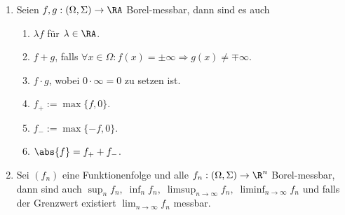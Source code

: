 \begin{prop}
\label{prop:3.24}
\begin{enumerate}[label=\arabic{*}.)]
  \item Seien $f,g: (\Omega,\Sigma)\to\RA$ Borel-messbar, dann sind es auch
  \begin{enumerate}[label=(\roman{*})]
    \item $\lambda f$ für $\lambda\in\RA$.
    \item $f+g$, falls $\forall x\in\Omega : f(x) = \pm\infty \Rightarrow g(x)\neq
  \mp\infty$.
  \item  $f\cdot g$, wobei $0\cdot\infty = 0$ zu setzen ist.
  \item $f_+ := \max\{f,0\}$.
  \item $f_- := \max\{-f,0\}$.
  \item $\abs{f} = f_+ + f_-$.
  \end{enumerate}
  \item Sei $(f_n)$ eine Funktionenfolge und alle $f_n:(\Omega,\Sigma)\to\R^n$
  Borel-messbar, dann sind auch $\sup_{n} f_n,\;\inf_n
  f_n,\; \limsup_{n\to\infty} f_n,\; \liminf_{n\to\infty} f_n$ und falls der
  Grenzwert existiert $\lim_{n\to\infty} f_n$ messbar.\fishhere
  \end{enumerate}
\end{prop}

